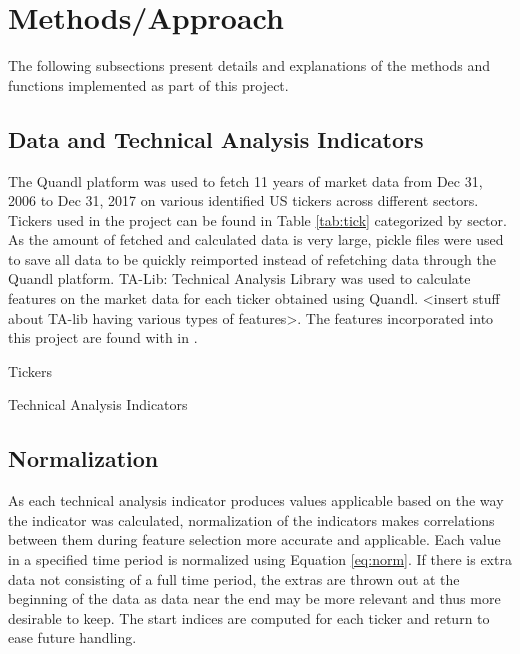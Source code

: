 \documentclass{article}
\begin{document}
\section{Methods/Approach}
The following subsections present details and explanations of the methods and functions implemented as part of this project.

\subsection{Data and Technical Analysis Indicators}
The Quandl platform was used to fetch 11 years of market data from Dec 31, 2006 to Dec 31, 2017 on various identified US tickers across different sectors. Tickers used in the project can be found in Table \ref{tab:tick} categorized by sector. As the amount of fetched and calculated data is very large, pickle files were used to save all data to be quickly reimported instead of refetching data through the Quandl platform. TA-Lib: Technical Analysis Library was used to calculate features on the market data for each ticker obtained using Quandl. <insert stuff about TA-lib having various types of features>. The features incorporated into this project are found with in .

\begin{table}[h]
	\centering
	\caption{Tickers}
	\label{tab:tick}
\end{table}

\begin{table}[h]
	\centering
	\caption{Technical Analysis Indicators}
	\label{tab:inds}
\end{table}

\subsection{Normalization}
As each technical analysis indicator produces values applicable based on the way the indicator was calculated, normalization of the indicators makes correlations between them during feature selection more accurate and applicable. Each value in a specified time period is normalized using Equation \eqref{eq:norm}. If there is extra data not consisting of a full time period, the extras are thrown out at the beginning of the data as data near the end may be more relevant and thus more desirable to keep. The start indices are computed for each ticker and return to ease future handling.
\end{document}
